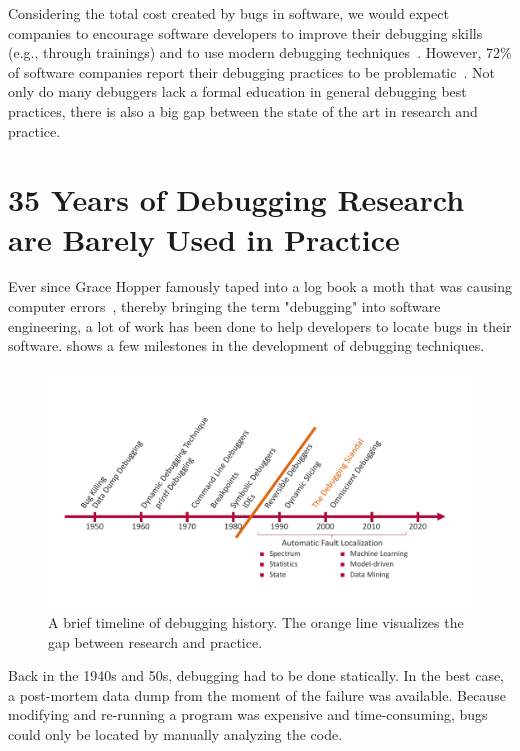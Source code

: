 Considering the total cost created by bugs in software, we would expect companies to encourage software developers to improve their debugging skills (e.g., through trainings) and to use modern debugging techniques~\cite{zhivich09:the_real_cost}.
However, 72\% of software companies report their debugging practices to be problematic~\cite{ballou08:improving_software_quality}.
Not only do many debuggers lack a formal education in general debugging best practices, there is also a big gap between the state of the art in research and practice.



\section{35 Years of Debugging Research are Barely Used in Practice}

Ever since Grace Hopper famously taped into a log book a moth that was causing computer errors~\cite{hopper47:log_book_with_computer}, thereby bringing the term "debugging" into software engineering, a lot of work has been done to help developers to locate bugs in their software.
 shows a few milestones in the development of debugging techniques.


\begin{figure}[t]
\centering
\includegraphics[width=\linewidth]{img/debugging-timeline}
\caption{A brief timeline of debugging history. The orange line visualizes the gap between research and practice.}
\label{fig:debugging-timeline}
\end{figure}

Back in the 1940s and 50s, debugging had to be done statically.
In the best case, a post-mortem data dump from the moment of the failure was available.
Because modifying and re-running a program was expensive and time-consuming, bugs could only be located by manually analyzing the code.

